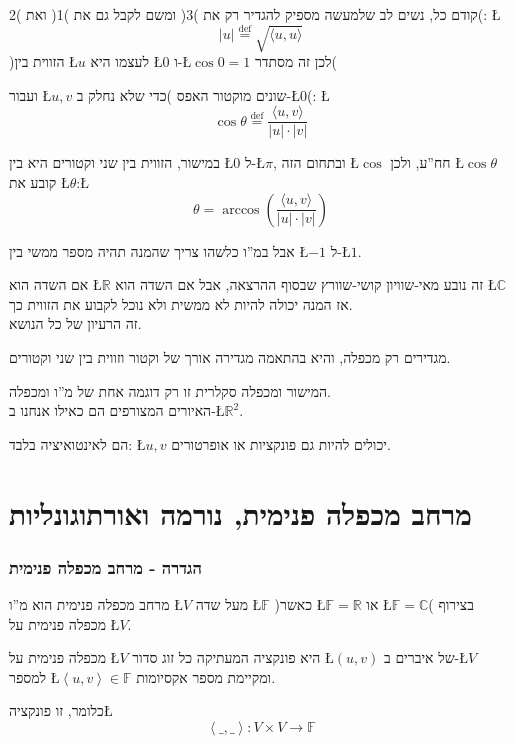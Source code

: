 \documentclass[english,hebrew]{article}
\begin{document}
קודם כל, נשים לב שלמעשה מספיק להגדיר רק את )3( ומשם לקבל גם את )1(
ואת )2(: \L{%
\[
|u|\overset{\text{def}}{=}\sqrt{\langle u,u\rangle}
\]
}%
)הזווית בין \L{$u$} לעצמו היא \L{$0$} ו-\L{$\cos0=1$} לכן זה מסתדר(

ועבור \L{$u,v$} שונים מוקטור האפס )כדי שלא נחלק ב-\L{$0$}(: \L{%
\[
\cos\theta\overset{\text{def}}{=}\frac{\langle u,v\rangle}{|u|\cdot|v|}
\]
}%

במישור, הזווית בין שני וקטורים היא בין \L{$0$} ל-\L{$\pi$}, ובתחום
הזה \L{$\cos$} חח\textquotedblright ע, ולכן \L{$\cos\theta$} קובע
את \L{$\theta$}:\L{%
\[
\theta=\arccos\left(\frac{\langle u,v\rangle}{|u|\cdot|v|}\right)
\]
}%

אבל במ\textquotedblright ו כלשהו צריך שהמנה תהיה מספר ממשי בין \L{$-1$}
ל-\L{$1$}.

אם השדה הוא \L{$\mathbb{R}$} זה נובע מאי-שוויון קושי-שוורץ שבסוף
ההרצאה, אבל אם השדה הוא \L{$\mathbb{C}$} אז המנה יכולה להיות לא ממשית
ולא נוכל לקבוע את הזווית כך.\\

זה הרעיון של כל הנושא.

מגדירים רק מכפלה, והיא בהתאמה מגדירה אורך של וקטור וזווית בין שני
וקטורים.

המישור ומכפלה סקלרית זו רק דוגמה אחת של מ\textquotedblright ו ומכפלה.\\

האיורים המצורפים הם כאילו אנחנו ב-\L{$\mathbb{R}^{2}$}.

הם לאינטואיציה בלבד: \L{$u,v$} יכולים להיות גם פונקציות או אופרטורים.

\part{מרחב מכפלה פנימית, נורמה ואורתוגונליות}

\section{הגדרה - מרחב מכפלה פנימית}

מרחב מכפלה פנימית הוא מ\textquotedblright ו \L{$V$} מעל שדה \L{$\mathbb{F}$}
)כאשר \L{$\mathbb{F}=\mathbb{R}$} או \L{$\mathbb{F}=\mathbb{C}$}(
בצירוף מכפלה פנימית על \L{$V$}.

מכפלה פנימית על \L{$V$} היא פונקציה המעתיקה כל זוג סדור \L{$\left(u,v\right)$}
של איברים ב-\L{$V$} למספר \L{$\left\langle u,v\right\rangle \in\mathbb{F}$}
ומקיימת מספר אקסיומות. 

כלומר, זו פונקציה\L{%
\[
\left\langle \_,\_\right\rangle :V\times V\rightarrow\mathbb{F}
\]
}%
\end{document}

